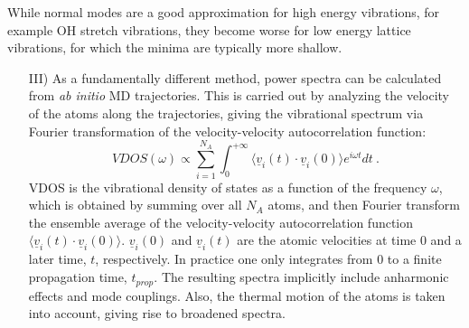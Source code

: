 \documentclass[11pt,DIV=13,BCOR=5mm,a4paper,headinclude]{scrbook}
\renewcommand{\vec}[1]{\underline{#1}}
\begin{document}
While normal modes are a good approximation for high energy vibrations, for example OH stretch vibrations, they become worse for low energy lattice vibrations, for which the minima are typically more shallow.
\begin{itemize}
\item[III)] As a fundamentally different method, power spectra can be calculated from \textit{ab initio} MD trajectories\cite{VAC}.
This is carried out by analyzing the velocity of the atoms along the trajectories, giving the vibrational spectrum via Fourier transformation of the velocity-velocity autocorrelation function:
\begin{equation}
 VDOS(\omega)\propto \sum_{i=1}^{N_A}\int_{0}^{+\infty}\langle\vec{v}_i(t)\cdot \vec{v}_i(0)\rangle e^{i\omega t}dt ~.
\end{equation}
VDOS is the vibrational density of states as a function of the frequency $\omega$, which is obtained by summing over all $N_A$ atoms, and then Fourier transform the ensemble average of the velocity-velocity autocorrelation function $\langle\vec{v}_i(t)\cdot \vec{v}_i(0)\rangle$.
$\vec{v}_i(0)$ and $\vec{v}_i(t)$ are the atomic velocities at time $0$ and a later time, $t$, respectively.
In practice one only integrates from 0 to a finite propagation time, $t_{prop}$.
The resulting spectra implicitly include anharmonic effects and mode couplings.
Also, the thermal motion of the atoms is taken into account\cite{hornicek2007,hudecova2012}, giving rise to broadened spectra.
\end{itemize}
\end{document}
